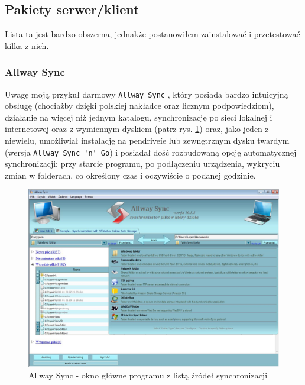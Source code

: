 \subsection{Pakiety serwer/klient}
Lista ta jest bardzo obszerna, jednakże postanowiłem zainstalować i przetestować kilka z nich.

\subsubsection{Allway Sync}
Uwagę moją przykuł darmowy \verb|Allway Sync| \cite{1}, który posiada bardzo intuicyjną obsługę (chociażby dzięki polskiej nakładce oraz licznym podpowiedziom), działanie na więcej niż jednym katalogu, synchronizację po sieci lokalnej i internetowej oraz z wymiennym dyskiem (patrz rys. \ref{allway}) oraz, jako jeden z niewielu, umożliwiał instalację na pendrive\'ie lub zewnętrznym dysku twardym (wersja \verb|Allway Sync 'n' Go|) i posiadał dość rozbudowaną opcję automatycznej synchronizacji: przy starcie programu, po podłączeniu urządzenia, wykryciu zmian w folderach, co określony czas i oczywiście o podanej godzinie.
\begin{figure}[h!]
	\centering
	\includegraphics[width=1\textwidth]{img/s3.jpeg}
	\caption{Allway Sync - okno główne programu z listą źródeł synchronizacji}
	\label{allway}
\end{figure}

